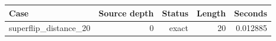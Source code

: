 {\small
\begin{tabular}{lrrrr}
\hline
Case & Source depth & Status & Length & Seconds \\
\hline
superflip\_distance\_20 & 0 & exact & 20 & 0.012885 \\
\hline
\end{tabular}
}
